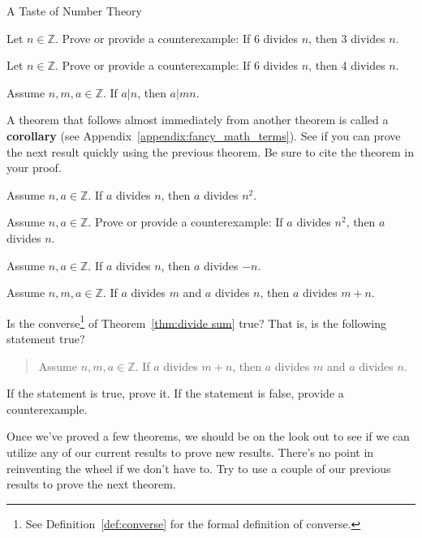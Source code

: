 \begin{section}{A Taste of Number Theory}
\begin{problem}
Let $n\in\mathbb{Z}$.  Prove or provide a counterexample: If 6 divides $n$, then 3 divides $n$.\end{problem}

\begin{problem}
Let $n\in\mathbb{Z}$.  Prove or provide a counterexample: If 6 divides $n$, then 4 divides $n$.
\end{problem}

\begin{theorem}
Assume $n,m,a\in\mathbb{Z}$.  If $a|n$, then $a|mn$.
\end{theorem}

A theorem that follows almost immediately from another theorem is called a \textbf{corollary} (see Appendix~\ref{appendix:fancy_math_terms}).  See if you can prove the next result quickly using the previous theorem.  Be sure to cite the theorem in your proof.

\begin{corollary}
Assume $n,a\in\mathbb{Z}$.  If $a$ divides $n$, then $a$ divides $n^2$.
\end{corollary}

\begin{problem}
Assume $n,a\in\mathbb{Z}$.  Prove or provide a counterexample:  If $a$ divides $n^2$, then $a$ divides $n$.
\end{problem}

\begin{theorem}
Assume $n,a\in\mathbb{Z}$. If $a$ divides $n$, then $a$ divides $-n$. 
\end{theorem}

\begin{theorem}\label{thm:divide sum}
Assume $n,m,a\in\mathbb{Z}$. If $a$ divides $m$ and $a$ divides $n$, then $a$ divides $m+n$. 
\end{theorem}

\begin{problem}
Is the converse\footnote{See Definition~\ref{def:converse} for the formal definition of converse.} of Theorem~\ref{thm:divide sum} true?  That is, is the following statement true?
\begin{quote}
Assume $n,m,a\in\mathbb{Z}$. If $a$ divides $m+n$, then $a$ divides $m$ and $a$ divides $n$.
\end{quote}
If the statement is true, prove it.  If the statement is false, provide a counterexample.
\end{problem}

Once we've proved a few theorems, we should be on the look out to see if we can utilize any of our current results to prove new results.  There's no point in reinventing the wheel if we don't have to.  Try to use a couple of our previous results to prove the next theorem.


\end{section}
